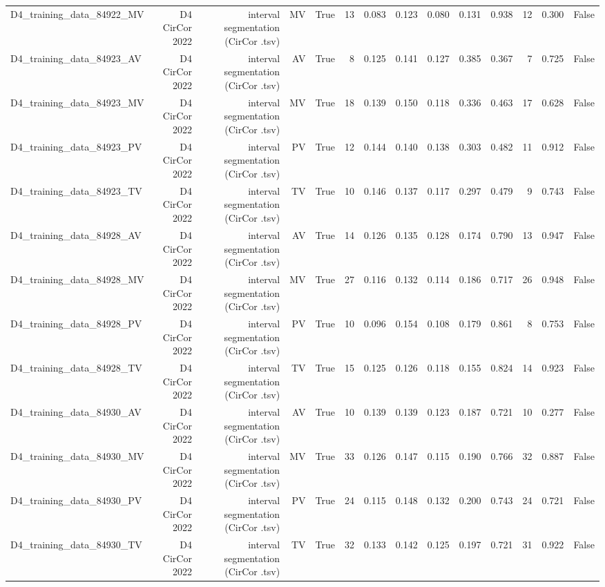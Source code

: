 \begin{table}[htbp]
\begin{tabular}{lrrrrrrrrrrrrr}
    D4\_training\_data\_84922\_MV & D4 CirCor 2022 & interval segmentation (CirCor .tsv) & MV & True & 13 & 0.083 & 0.123 & 0.080 & 0.131 & 0.938 & 12 & 0.300 & False \\
    D4\_training\_data\_84923\_AV & D4 CirCor 2022 & interval segmentation (CirCor .tsv) & AV & True & 8 & 0.125 & 0.141 & 0.127 & 0.385 & 0.367 & 7 & 0.725 & False \\
    D4\_training\_data\_84923\_MV & D4 CirCor 2022 & interval segmentation (CirCor .tsv) & MV & True & 18 & 0.139 & 0.150 & 0.118 & 0.336 & 0.463 & 17 & 0.628 & False \\
    D4\_training\_data\_84923\_PV & D4 CirCor 2022 & interval segmentation (CirCor .tsv) & PV & True & 12 & 0.144 & 0.140 & 0.138 & 0.303 & 0.482 & 11 & 0.912 & False \\
    D4\_training\_data\_84923\_TV & D4 CirCor 2022 & interval segmentation (CirCor .tsv) & TV & True & 10 & 0.146 & 0.137 & 0.117 & 0.297 & 0.479 & 9 & 0.743 & False \\
    D4\_training\_data\_84928\_AV & D4 CirCor 2022 & interval segmentation (CirCor .tsv) & AV & True & 14 & 0.126 & 0.135 & 0.128 & 0.174 & 0.790 & 13 & 0.947 & False \\
    D4\_training\_data\_84928\_MV & D4 CirCor 2022 & interval segmentation (CirCor .tsv) & MV & True & 27 & 0.116 & 0.132 & 0.114 & 0.186 & 0.717 & 26 & 0.948 & False \\
    D4\_training\_data\_84928\_PV & D4 CirCor 2022 & interval segmentation (CirCor .tsv) & PV & True & 10 & 0.096 & 0.154 & 0.108 & 0.179 & 0.861 & 8 & 0.753 & False \\
    D4\_training\_data\_84928\_TV & D4 CirCor 2022 & interval segmentation (CirCor .tsv) & TV & True & 15 & 0.125 & 0.126 & 0.118 & 0.155 & 0.824 & 14 & 0.923 & False \\
    D4\_training\_data\_84930\_AV & D4 CirCor 2022 & interval segmentation (CirCor .tsv) & AV & True & 10 & 0.139 & 0.139 & 0.123 & 0.187 & 0.721 & 10 & 0.277 & False \\
    D4\_training\_data\_84930\_MV & D4 CirCor 2022 & interval segmentation (CirCor .tsv) & MV & True & 33 & 0.126 & 0.147 & 0.115 & 0.190 & 0.766 & 32 & 0.887 & False \\
    D4\_training\_data\_84930\_PV & D4 CirCor 2022 & interval segmentation (CirCor .tsv) & PV & True & 24 & 0.115 & 0.148 & 0.132 & 0.200 & 0.743 & 24 & 0.721 & False \\
    D4\_training\_data\_84930\_TV & D4 CirCor 2022 & interval segmentation (CirCor .tsv) & TV & True & 32 & 0.133 & 0.142 & 0.125 & 0.197 & 0.721 & 31 & 0.922 & False \\

\end{tabular}
\end{table}
